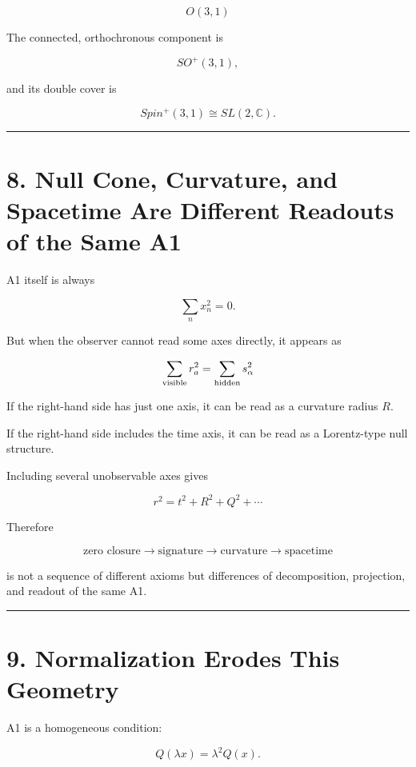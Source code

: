 \documentclass[
  a4paper,
]{article}
\begin{document}
\[
\boxed{
O(3,1)
}
\]

The connected, orthochronous component is

\[
SO^+(3,1),
\]

and its double cover is

\[
\boxed{
Spin^+(3,1)\cong SL(2,\mathbb C)
}.
\]

\begin{center}\rule{0.5\linewidth}{0.5pt}\end{center}

\section{8. Null Cone, Curvature, and Spacetime Are Different Readouts
of the Same
A1}\label{null-cone-curvature-and-spacetime-are-different-readouts-of-the-same-a1}

A1 itself is always

\[
\sum_nx_n^2=0.
\]

But when the observer cannot read some axes directly, it appears as

\[
\sum_{\rm visible}r_a^2
=
\sum_{\rm hidden}s_\alpha^2
\]

If the right-hand side has just one axis, it can be read as a curvature
radius \(R\).

If the right-hand side includes the time axis, it can be read as a
Lorentz-type null structure.

Including several unobservable axes gives

\[
r^2=t^2+R^2+Q^2+\cdots
\]

Therefore

\[
\boxed{
\text{zero closure}
\to
\text{signature}
\to
\text{curvature}
\to
\text{spacetime}
}
\]

is not a sequence of different axioms but differences of decomposition,
projection, and readout of the same A1.

\begin{center}\rule{0.5\linewidth}{0.5pt}\end{center}

\section{9. Normalization Erodes This
Geometry}\label{normalization-erodes-this-geometry}

A1 is a homogeneous condition:

\[
Q(\lambda x)=\lambda^2Q(x).
\]
\end{document}
